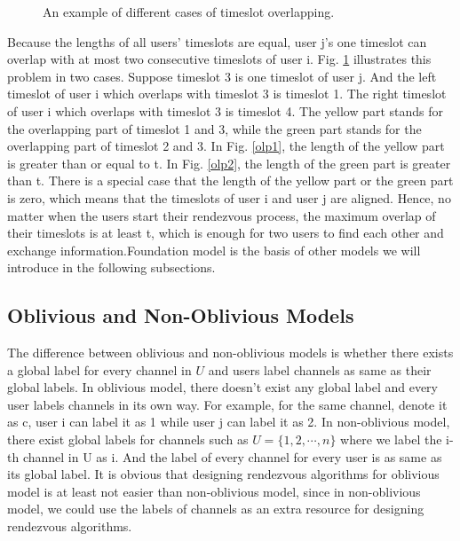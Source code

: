 \documentclass[10pt, conference, letterpaper]{IEEEtran}
\begin{document}
\begin{figure}
\centering
{}
\caption{An example of different cases of timeslot overlapping.}
\label{overlap}
\end{figure}

Because the lengths of all users' timeslots are equal, user j's one timeslot can overlap with at most two consecutive timeslots of user i. Fig. \ref{overlap} illustrates this problem in two cases. Suppose timeslot 3 is one timeslot of user j. And the left timeslot of user i which overlaps with timeslot 3 is timeslot 1. The right timeslot of user i which overlaps with timeslot 3 is timeslot 4. The yellow part stands for the overlapping part of timeslot 1 and 3, while the green part stands for the overlapping part of timeslot 2 and 3. In Fig. \ref{olp1}, the length of the yellow part is greater than or equal to t. In Fig. \ref{olp2}, the length of the green part is greater than t.
There is a special case that the length of the yellow part or the green part is zero, which means that the timeslots of user i and user j are aligned.
Hence, no matter when the users start their rendezvous process, the maximum overlap of their timeslots is at least t, which is enough for two users to find each other and exchange information.Foundation model is the basis of other models we will introduce in the following subsections.

\subsection{Oblivious and Non-Oblivious Models}
The difference between oblivious and non-oblivious models is whether there exists a global label for every channel in $U$ and users label channels as same as their global labels. In oblivious model, there doesn't exist any global label and every user labels channels in its own way. For example, for the same channel, denote it as c, user i can label it as 1 while user j can label it as 2. In non-oblivious model, there exist global labels for channels such as $U=\{1,2,\cdots,n\}$ where we label the i-th channel in U as i. And the label of every channel for every user is as same as its global label.  It is obvious that designing rendezvous algorithms for oblivious model is at least not easier than non-oblivious model, since in non-oblivious model, we could use the labels of channels as an extra resource for designing rendezvous algorithms.
\end{document}
